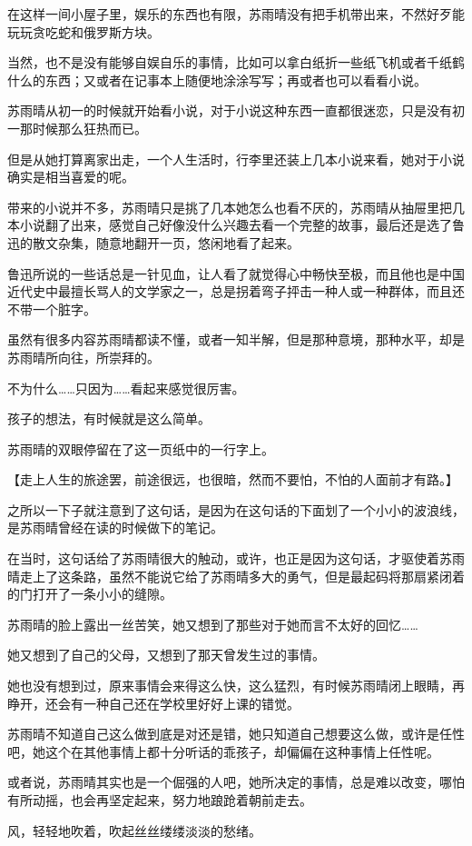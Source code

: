 在这样一间小屋子里，娱乐的东西也有限，苏雨晴没有把手机带出来，不然好歹能玩玩贪吃蛇和俄罗斯方块。

当然，也不是没有能够自娱自乐的事情，比如可以拿白纸折一些纸飞机或者千纸鹤什么的东西；又或者在记事本上随便地涂涂写写；再或者也可以看看小说。

苏雨晴从初一的时候就开始看小说，对于小说这种东西一直都很迷恋，只是没有初一那时候那么狂热而已。

但是从她打算离家出走，一个人生活时，行李里还装上几本小说来看，她对于小说确实是相当喜爱的呢。

带来的小说并不多，苏雨晴只是挑了几本她怎么也看不厌的，苏雨晴从抽屉里把几本小说翻了出来，感觉自己好像没什么兴趣去看一个完整的故事，最后还是选了鲁迅的散文杂集，随意地翻开一页，悠闲地看了起来。

鲁迅所说的一些话总是一针见血，让人看了就觉得心中畅快至极，而且他也是中国近代史中最擅长骂人的文学家之一，总是拐着弯子抨击一种人或一种群体，而且还不带一个脏字。

虽然有很多内容苏雨晴都读不懂，或者一知半解，但是那种意境，那种水平，却是苏雨晴所向往，所崇拜的。

不为什么……只因为……看起来感觉很厉害。

孩子的想法，有时候就是这么简单。

苏雨晴的双眼停留在了这一页纸中的一行字上。

【走上人生的旅途罢，前途很远，也很暗，然而不要怕，不怕的人面前才有路。】

之所以一下子就注意到了这句话，是因为在这句话的下面划了一个小小的波浪线，是苏雨晴曾经在读的时候做下的笔记。

在当时，这句话给了苏雨晴很大的触动，或许，也正是因为这句话，才驱使着苏雨晴走上了这条路，虽然不能说它给了苏雨晴多大的勇气，但是最起码将那扇紧闭着的门打开了一条小小的缝隙。

苏雨晴的脸上露出一丝苦笑，她又想到了那些对于她而言不太好的回忆……

她又想到了自己的父母，又想到了那天曾发生过的事情。

她也没有想到过，原来事情会来得这么快，这么猛烈，有时候苏雨晴闭上眼睛，再睁开，还会有一种自己还在学校里好好上课的错觉。

苏雨晴不知道自己这么做到底是对还是错，她只知道自己想要这么做，或许是任性吧，她这个在其他事情上都十分听话的乖孩子，却偏偏在这种事情上任性呢。

或者说，苏雨晴其实也是一个倔强的人吧，她所决定的事情，总是难以改变，哪怕有所动摇，也会再坚定起来，努力地踉跄着朝前走去。

风，轻轻地吹着，吹起丝丝缕缕淡淡的愁绪。

